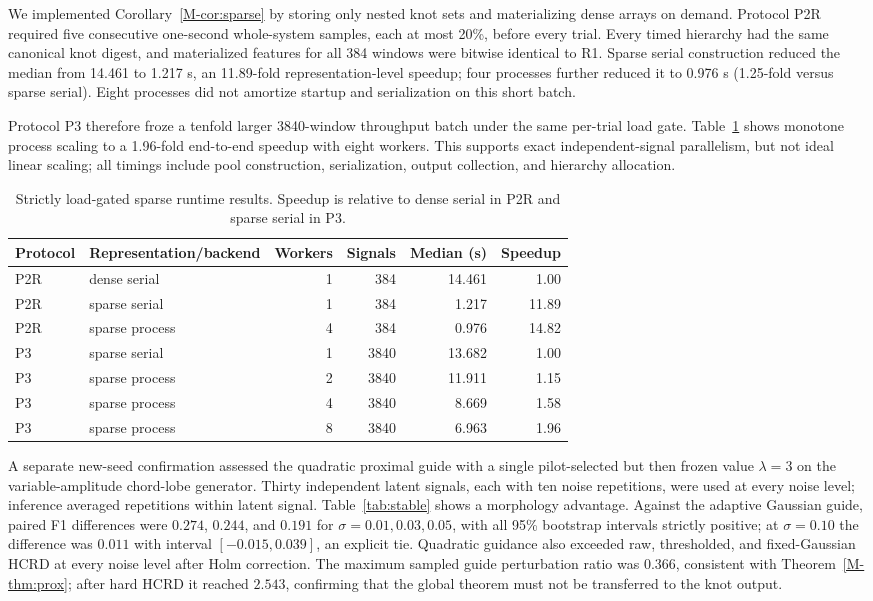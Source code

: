 We implemented Corollary~\ref{M-cor:sparse} by storing only nested knot sets and
materializing dense arrays on demand. Protocol P2R required five consecutive
one-second whole-system samples, each at most 20\%, before every trial.  Every
timed hierarchy had the same canonical knot digest, and materialized features
for all 384 windows were bitwise identical to R1.  Sparse serial construction
reduced the median from 14.461 to 1.217 s, an 11.89-fold representation-level
speedup; four processes further reduced it to 0.976 s (1.25-fold versus sparse
serial).  Eight processes did not amortize startup and serialization on this
short batch.

Protocol P3 therefore froze a tenfold larger 3840-window throughput batch under
the same per-trial load gate.  Table~\ref{tab:sparse-runtime} shows monotone
process scaling to a 1.96-fold end-to-end speedup with eight workers.  This
supports exact independent-signal parallelism, but not ideal linear scaling;
all timings include pool construction, serialization, output collection, and
hierarchy allocation.

\begin{table}[H]
\centering
\caption{Strictly load-gated sparse runtime results.  Speedup is relative to
dense serial in P2R and sparse serial in P3.}
\label{tab:sparse-runtime}
\begin{tabular}{llrrrr}
\toprule
Protocol & Representation/backend & Workers & Signals & Median (s) & Speedup \\
\midrule
P2R & dense serial & 1 & 384 & 14.461 & 1.00 \\
P2R & sparse serial & 1 & 384 & 1.217 & 11.89 \\
P2R & sparse process & 4 & 384 & 0.976 & 14.82 \\
P3 & sparse serial & 1 & 3840 & 13.682 & 1.00 \\
P3 & sparse process & 2 & 3840 & 11.911 & 1.15 \\
P3 & sparse process & 4 & 3840 & 8.669 & 1.58 \\
P3 & sparse process & 8 & 3840 & 6.963 & 1.96 \\
\bottomrule
\end{tabular}
\end{table}

A separate new-seed confirmation assessed the quadratic proximal guide with a
single pilot-selected but then frozen value $\lambda=3$ on the variable-amplitude
chord-lobe generator.  Thirty independent latent signals, each with ten noise
repetitions, were used at every noise level; inference averaged repetitions
within latent signal.  Table~\ref{tab:stable} shows a morphology advantage.
Against the adaptive Gaussian guide, paired F1 differences were $0.274$, $0.244$,
and $0.191$ for $\sigma=0.01,0.03,0.05$, with all 95\% bootstrap intervals
strictly positive; at $\sigma=0.10$ the difference was $0.011$ with interval
$[-0.015,0.039]$, an explicit tie.  Quadratic guidance also exceeded raw,
thresholded, and fixed-Gaussian HCRD at every noise level after Holm correction.
The maximum sampled guide perturbation ratio was $0.366$, consistent with
Theorem~\ref{M-thm:prox}; after hard HCRD it reached $2.543$, confirming that the
global theorem must not be transferred to the knot output.

